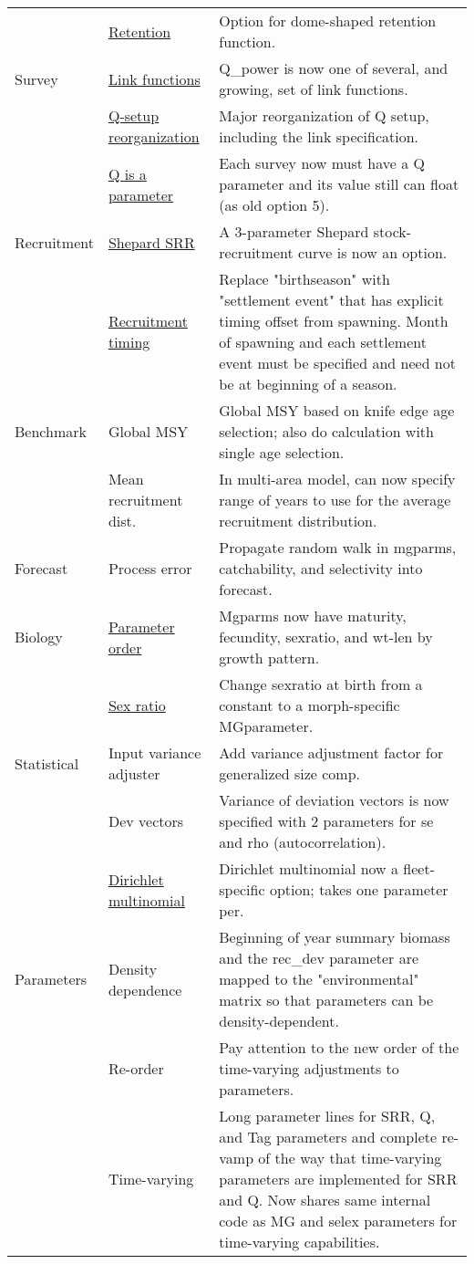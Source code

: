 \begin{center}
\begin{longtable}{p{2cm} p{3cm} p{10cm}}
						& \hyperlink{DomeRetention}{Retention} & Option for dome-shaped retention function. \\
				Survey  & \hyperlink{Qsetup}{Link functions} & Q\_power is now one of several, and growing, set of link functions. \\
						& \hyperlink{Qsetup}{Q-setup reorganization} & Major reorganization of Q setup, including the link specification. \\
						& \hyperlink{Qsetup}{Q is a parameter} & Each survey now must have a Q parameter and its value still can float (as old option 5).\\
				Recruitment & \hyperlink{Shepard}{Shepard SRR} & A 3-parameter Shepard stock-recruitment curve is now an option.\\
						& \hyperlink{RecrTiming}{Recruitment timing} & Replace "birthseason" with "settlement event" that has explicit timing offset from spawning.  Month of spawning and each settlement event must be specified and need not be at beginning of a season.\\
				Benchmark & Global MSY &  Global MSY based on knife edge age selection; also do calculation with single age selection. \\
					    & Mean recruitment dist. & In multi-area model, can now specify range of years to use for the average recruitment distribution.\\
				Forecast & Process error & Propagate random walk in mgparms, catchability, and selectivity into forecast.\\
				Biology & \hyperlink{MGorder}{Parameter order} & Mgparms now have maturity, fecundity, sexratio, and wt-len by growth pattern.\\
				        & \hyperlink{SexRatio}{Sex ratio} & Change sexratio at birth from a constant to a morph-specific MGparameter. \\
				Statistical & Input variance adjuster & Add variance adjustment factor for generalized size comp. \\
						& Dev vectors & Variance of deviation vectors is now specified with 2 parameters for se and rho (autocorrelation).\\
						& \hyperlink{Dirichlet}{Dirichlet multinomial} & Dirichlet multinomial now a fleet-specific option; takes one parameter per. \\
				Parameters & Density dependence & Beginning of year summary biomass and the rec\_dev parameter are mapped to the    "environmental" matrix so that parameters can be density-dependent.\\
						& Re-order & Pay attention to the new order of the time-varying adjustments to parameters. \\
						& Time-varying & Long parameter lines for SRR, Q, and Tag parameters and complete re-vamp of the way that time-varying parameters are implemented for SRR and Q.  Now shares same internal code as MG and selex parameters for time-varying capabilities.\\
				\hline	
			\end{longtable}
		\end{center}

